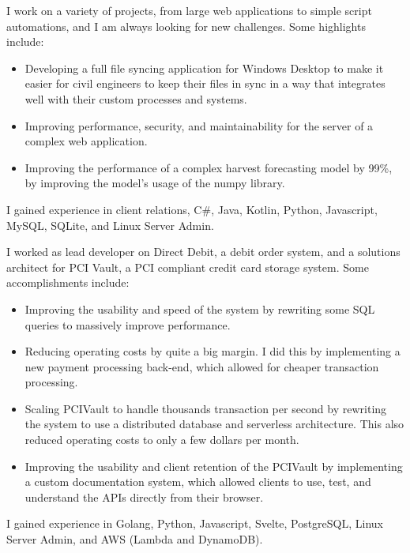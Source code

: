 \documentclass[a4paper]{twentysecondcv} %
\begin{document}
\begin{twenty} %
    {I work on a variety of projects, from large web applications to simple script automations, and I am always looking for new challenges. Some highlights include:
    \begin{itemize}
        \item Developing a full file syncing application for Windows Desktop to make it easier for civil engineers to keep their files in sync in a way that integrates well with their custom processes and systems.
        \item Improving performance, security, and maintainability for the server of a complex web application.
        \item Improving the performance of a complex harvest forecasting model by 99\%, by improving the model's usage of the numpy library.
    \end{itemize}
    I gained experience in client relations, C\#, Java, Kotlin, Python, Javascript, MySQL, SQLite, and Linux Server Admin.}
        {I worked as lead developer on Direct Debit, a debit order system, and a solutions architect for PCI Vault, a PCI compliant credit card storage system.
        Some accomplishments include:
        \begin{itemize}
            \item Improving the usability and speed of the system by rewriting some SQL queries to massively improve performance.
            \item Reducing operating costs by quite a big margin. I did this by implementing a new payment processing back-end, which allowed for cheaper transaction processing.
            \item Scaling PCIVault to handle thousands transaction per second by rewriting the system to use a distributed database and serverless architecture. This also reduced operating costs to only a few dollars per month.
            \item Improving the usability and client retention of the PCIVault by implementing a custom documentation system, which allowed clients to use, test, and understand the APIs directly from their browser.
        \end{itemize}
        I gained experience in Golang, Python, Javascript, Svelte, PostgreSQL, Linux Server Admin, and AWS (Lambda and DynamoDB).}

\end{twenty}
\end{document}
